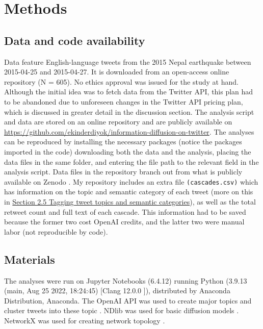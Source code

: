 \documentclass[11pt,a4paper]{article}
\begin{document}
\clearpage
\section{Methods}
    \subsection{Data and code availability}
    Data feature English-language tweets from the 2015 Nepal earthquake between 2015-04-25 and 2015-04-27. It is downloaded from an open-access online repository \cite{bhowmick_twitter_2019} (N = 605). No ethics approval was issued for the study at hand. Although the initial idea was to fetch data from the Twitter API, this plan had to be abandoned due to unforeseen changes in the Twitter API pricing plan, which is discussed in greater detail in the discussion section. The analysis script and data are stored on an online repository and are publicly available on \href{https://github.com/ekinderdiyok/information-diffusion-on-twitter}{https://github.com/ekinderdiyok/information-diffusion-on-twitter}. The analyses can be reproduced by installing the necessary packages (notice the packages imported in the code) downloading both the data and the analysis, placing the data files in the same folder, and entering the file path to the relevant field in the analysis script. Data files in the repository branch out from what is publicly available on Zenodo \cite{bhowmick_twitter_2019}. My repository includes an extra file \texttt{(cascades.csv)} which has information on the topic and semantic category of each tweet (more on this in \hyperlink{sec:tagging-tweet-topic}{Section 2.5 Tagging tweet topics and semantic categories}), as well as the total retweet count and full text of each cascade. This information had to be saved because the former two cost OpenAI credits, and the latter two were manual labor (not reproducible by code).
    
    \subsection{Materials}
    The analyses were run on Jupyter Notebooks (6.4.12) running Python (3.9.13 (main, Aug 25 2022, 18:24:45) [Clang 12.0.0 ]), distributed by Anaconda Distribution, Anaconda\textregistered. The OpenAI API was used to create major topics and cluster tweets into these topic \cite{openai_llc_openai_2023-1}. NDlib was used for basic diffusion models \cite{rossetti_ndlib_2018,rossetti_ndlib_2017}. NetworkX was used for creating network topology \cite{hagberg_exploring_2008}.
\end{document}
